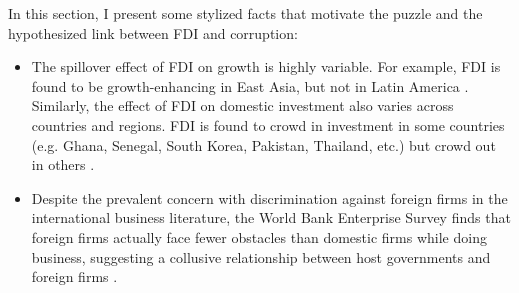 In this section, I present some stylized facts that motivate the puzzle and the hypothesized link between FDI and corruption:

\begin{itemize}
	\item The spillover effect of FDI on growth is highly variable. For example, FDI is found to be growth-enhancing in East Asia, but not in Latin America \citep{Zhang2001}. Similarly, the effect of FDI on domestic investment also varies across countries and regions. FDI is found to crowd in investment in some countries (e.g. Ghana, Senegal, South Korea, Pakistan, Thailand, etc.) but crowd out in others \citep{Agosin2005}.
	
	\item Despite the prevalent concern with discrimination against foreign firms in the international business literature, the World Bank Enterprise Survey finds that foreign firms actually face fewer obstacles than domestic firms while doing business, suggesting a collusive relationship between host governments and foreign firms \citep{Batra2003}.
\end{itemize}
